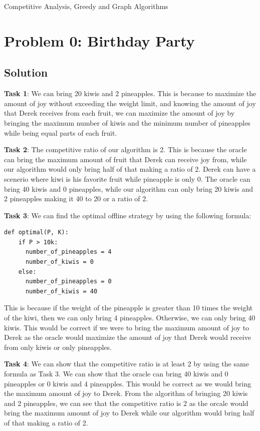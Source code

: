 \documentclass[12pt,letterpaper]{article}
\begin{document}
\begin{center}
    \LARGE Competitive Analysis, Greedy and Graph Algorithms
\end{center}

\section*{Problem 0: Birthday Party}

\subsection*{Solution}
\textbf{Task 1}: We can bring 20 kiwis and 2 pineapples. This is because to maximize the
amount of joy without exceeding the weight limit, and knowing the amount of joy that Derek
receives from each fruit, we can maximize the amount of joy by bringing the maximum number
of kiwis and the minimum number of pineapples while being equal parts of each fruit. 

\textbf{Task 2}: The competitive ratio of our algorithm is 2. This is because the oracle can
bring the maximum amount of fruit that Derek can receive joy from, while our algorithm would
only bring half of that making a ratio of 2. Derek can have a scenerio where kiwi is his favorite
fruit while pineapple is only 0. The oracle can bring 40 kiwis and 0 pineapples,
while our algorithm can only bring 20 kiwis and 2 pineapples making it 40 to 20 or a ratio of 2.

\textbf{Task 3}: 
We can find the optimal offline strategy by using the following formula:
\begin{lstlisting}
def optimal(P, K):
    if P > 10k:
      number_of_pineapples = 4
      number_of_kiwis = 0
    else:
      number_of_pineapples = 0
      number_of_kiwis = 40
\end{lstlisting}
This is because if the weight of the pineapple is greater than 10 times the weight of the kiwi,
then we can only bring 4 pineapples. Otherwise, we can only bring 40 kiwis. This would be correct if
we were to bring the maximum amount of joy to Derek as the oracle would maximize the amount
of joy that Derek would receive from only kiwis or only pineapples. 

\textbf{Task 4}: We can show that the competitive ratio is at least 2 by using the same
formula as Task 3. We can show that the oracle can bring 40 kiwis and 0 pineapples
or 0 kiwis and 4 pineapples. This would be correct as we would bring the maximum amount of
joy to Derek. From the algorithm of bringing 20 kiwis and 2 pineapples, we can see that the
competitive ratio is 2 as the orcale would bring the maximum amount of joy to Derek while our
algorithm would bring half of that making a ratio of 2.
\end{document}
